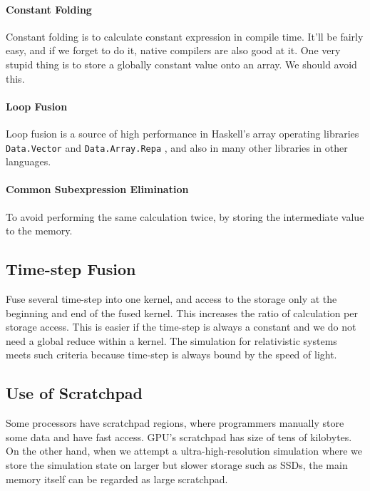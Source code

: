 \documentclass[twocolumn]{article}
\begin{document}
\paragraph{Constant Folding}
Constant folding is to calculate constant expression in compile
time. It'll be fairly easy, and if we forget to do it, native
compilers are also good at it. One very stupid thing is to store a
globally constant value onto an array. We should avoid this.

\paragraph{Loop Fusion}

Loop fusion is a source of high performance in Haskell's array operating
libraries {\tt Data.Vector} and {\tt Data.Array.Repa}
\cite{Keller:2010:RSP:1932681.1863582}, and also in many other libraries in
other languages.


\paragraph{Common Subexpression Elimination}

To avoid performing the same calculation twice, by storing the intermediate
value to the memory. 

\subsection{Time-step Fusion}

Fuse several time-step into one kernel, and access to the storage only at the
beginning and end of the fused kernel. This increases the ratio of
calculation per storage access. This is easier if the time-step is always a
constant and we do not need a global reduce within a kernel. The simulation
for relativistic systems meets such criteria because time-step is always bound
by the speed of light.

\subsection{Use of Scratchpad}

Some processors have scratchpad regions, where programmers manually store some
data and have fast access. GPU's scratchpad has size of tens of kilobytes. On
the other hand, when we attempt a ultra-high-resolution simulation where we
store the simulation state on larger but slower storage such as SSDs, the main
memory itself can be regarded as large scratchpad. 
\end{document}
